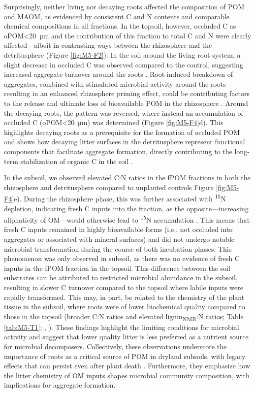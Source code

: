 Surprisingly, neither living nor decaying roots affected the composition of POM and MAOM, as evidenced by consistent C and N contents and comparable chemical compositions in all fractions. In the topsoil, however, occluded C as oPOM<\SI{20}{\micro\metre} and the contribution of this fraction to total C and N were clearly affected---albeit in contrasting ways between the rhizosphere and the detritusphere (Figure \ref{fig:M5-F2}). In the soil around the living root system, a slight decrease in occluded C was observed compared to the control, suggesting increased aggregate turnover around the roots \citep{Wang2020}. Root-induced breakdown of aggregates, combined with stimulated microbial activity around the roots resulting in an enhanced rhizosphere priming effect, could be contributing factors to the release and ultimate loss of bioavailable POM in the rhizosphere \citep{Cheng2009}. Around the decaying roots, the pattern was reversed, where instead an accumulation of occluded C (oPOM<\SI{20}{\micro\metre}) was determined (Figure \ref{fig:M5-F4}d). This highlights decaying roots as a prerequisite for the formation of occluded POM and shows how decaying litter surfaces in the detritusphere represent functional components that facilitate aggregate formation, directly contributing to the long-term stabilization of organic C in the soil \citep{Witzgall2021}.

In the subsoil, we observed elevated C:N ratios in the fPOM fractions in both the rhizosphere and detritusphere compared to unplanted controls Figure \ref{fig:M5-F4}e). During the rhizosphere phase, this was further associated with \textsuperscript{15}N depletion, indicating fresh C inputs into the fraction, as the opposite---increasing aliphaticity of OM---would otherwise lead to \textsuperscript{15}N accumulation \citep{Kramer2003}. This means that fresh C inputs remained in highly bioavailable forms (i.e., not occluded into aggregates or associated with mineral surfaces) and did not undergo notable microbial transformation during the course of both incubation phases. This phenomenon was only observed in subsoil, as there was no evidence of fresh C inputs in the fPOM fraction in the topsoil. This difference between the soil substrates can be attributed to restricted microbial abundance in the subsoil, resulting in slower C turnover compared to the topsoil where labile inputs were rapidly transformed. This may, in part, be related to the chemistry of the plant tissue in the subsoil, where roots were of lower biochemical quality compared to those in the topsoil (broader C:N ratios and elevated lignin\textsubscript{NMR}:N ratios; Table \ref{tab:M5-T1}; \citeauthor{Walela2014}, \citeyear{Walela2014}). These findings highlight the limiting conditions for microbial activity and suggest that lower quality litter is less preferred as a nutrient source for microbial decomposers. Collectively, these observations underscore the importance of roots as a critical source of POM in dryland subsoils, with legacy effects that can persist even after plant death \citep{Angst2016}. Furthermore, they emphasize how the litter chemistry of OM inputs shapes microbial community composition, with implications for aggregate formation.

